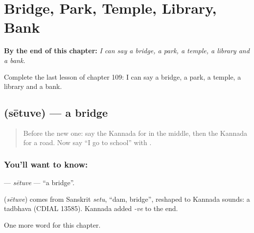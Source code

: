 
\chapter{Bridge, Park, Temple, Library, Bank}
\label{ch:ka-bridge-park-temple-library-bank}

\begin{chapteropening}
\textbf{By the end of this chapter:} \emph{I can say a bridge, a park, a temple, a library and a bank.}

Complete the last lesson of chapter 109: I can say a bridge, a park, a temple, a library and a bank.
\end{chapteropening}

\section[\texorpdfstring{\kn{ಸೇತುವೆ} (sētuve)}{ಸೇತುವೆ (sētuve)}]{ (sētuve) — a bridge}

\label{lesson:KA-C109-setuve}



\begin{quote}
Before the new one: say the Kannada for in the middle, then the Kannada for a road. Now say “I go to school” with \textbf{}.
\end{quote}

\subsection*{You'll want to know: }
\textbf{} — \emph{sētuve} — \textquotedblleft{}a bridge\textquotedblright{}.

\begin{cousinweb}
\textbf{} (\emph{sētuve}) comes from Sanskrit \emph{setu}, \textquotedblleft{}dam, bridge\textquotedblright{}, reshaped to Kannada sounds: a tadbhava (CDIAL 13585). Kannada added \emph{-ve} to the end.
\end{cousinweb}

\begin{grammarlens}[title={What you've built}]
One more word for this chapter.
\end{grammarlens}

